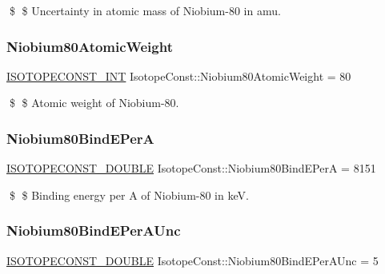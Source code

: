 \$ \$ Uncertainty in atomic mass of Niobium-\/80 in amu. \mbox{\label{group___isotope_const-_niobium-_nb80_ga8e2f74988517d877b8ab9a744b745aa4}} 
\subsubsection{\texorpdfstring{Niobium80\+Atomic\+Weight}{Niobium80AtomicWeight}}
{\footnotesize\ttfamily \mbox{\hyperlink{group___isotope_const-_macros_ga5f18360b3e99483a35c32d789e62621c}{I\+S\+O\+T\+O\+P\+E\+C\+O\+N\+S\+T\+\_\+\+I\+NT}} Isotope\+Const\+::\+Niobium80\+Atomic\+Weight = 80}

\$ \$ Atomic weight of Niobium-\/80. \mbox{\label{group___isotope_const-_niobium-_nb80_gad0620855f1ccc1cb7692ad31f8c2431e}} 
\subsubsection{\texorpdfstring{Niobium80\+Bind\+E\+PerA}{Niobium80BindEPerA}}
{\footnotesize\ttfamily \mbox{\hyperlink{group___isotope_const-_macros_ga8f45a7272ce02c0b4c65c44636ed719a}{I\+S\+O\+T\+O\+P\+E\+C\+O\+N\+S\+T\+\_\+\+D\+O\+U\+B\+LE}} Isotope\+Const\+::\+Niobium80\+Bind\+E\+PerA = 8151}

\$ \$ Binding energy per A of Niobium-\/80 in keV. \mbox{\label{group___isotope_const-_niobium-_nb80_ga072ee3994e24b741b0d37b6f2eb8d31f}} 
\subsubsection{\texorpdfstring{Niobium80\+Bind\+E\+Per\+A\+Unc}{Niobium80BindEPerAUnc}}
{\footnotesize\ttfamily \mbox{\hyperlink{group___isotope_const-_macros_ga8f45a7272ce02c0b4c65c44636ed719a}{I\+S\+O\+T\+O\+P\+E\+C\+O\+N\+S\+T\+\_\+\+D\+O\+U\+B\+LE}} Isotope\+Const\+::\+Niobium80\+Bind\+E\+Per\+A\+Unc = 5}

